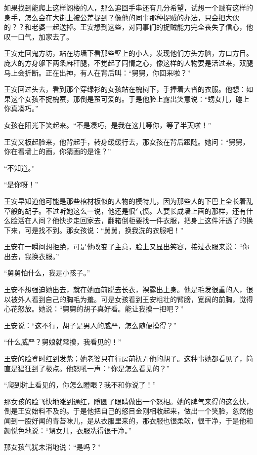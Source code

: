 如果找到能爬上这样阁楼的人，那么追回手串还有几分希望，试想一个贼有这样的身手，怎么会在大街上被公差捉到？像他的同事那种捉贼的办法，只会把大伙的？？和老婆一起送掉。王安想到这些，对同事们的捉贼能力完全丧失了信心，他叹一口气，加家去了。 

王安走回鬼方坊，站在坊墙下看那些壁上的小人，发现他们方头方脑，方口方目。庞大的方身躯下两条麻秆腿，不觉起了同情之心，像这样的人物要是活过来，双腿马上会折断。正在出神，有人在背后叫：“舅舅，你回来啦？” 

王安回过头去，看到那个穿绿衫的女孩站在槐树下，手捧着大沓的衣服。他想：如果这个女孩不捉槐蚕，那倒是蛮可爱的。于是他脸上露出笑意说：“甥女儿，碰上你真凑巧。” 

女孩在阳光下笑起来。“不是凑巧，是我在这儿等你，等了半天啦！” 

王安又板起脸来，他背起手，转身缓缓行去，那女孩在背后跟随。她问：“舅舅，你在看墙上的画，你猜画的是谁？” 

“不知道。” 

“是你呀！” 

王安早知道他可能是那些棺材板似的人物的模特儿，因为那些人的下巴上全长着乱草般的胡子。不过听她这么一说，他还是很气愤。人要长成墙上画的那样，还有什么脸活在人间？他快步走回家去，翻箱倒柜要找一件衣服，把身上这件汗透了的换下来，可是找不到。那女孩说：“舅舅，换我洗的衣服吧！” 

王安在一瞬间想拒绝，可是他改变了主意，脸上又显出笑容，接过衣服来说：“你出去，我换衣服。” 

“舅舅怕什么，我是小孩子。” 

王安不想强迫她出去，就在她面前脱去长衣，裸露出上身。他是毛发很重的人，很以被外人看到自己的胸毛为羞。可是女孩看到王安粗壮的臂膀，宽阔的前胸，觉得心花怒放。她说：“舅舅的胡子真好看。能让我摸一把吧？” 

王安说：“这不行，胡子是男人的威严，怎么随便摸得？” 

“什么威严？舅娘就常摸，我看见的！” 

王安的脸登时红到发紫；她老婆只在行房前抚弄他的胡子。这种事她都看见了，简直是猖狂到了极点。他怒吼一声：“你是怎么看见的？” 

“爬到树上看见的，你怎么瞪眼？我不和你说了！” 

那女孩的脸飞快地涨到通红，瞪圆了眼睛做出一个怒相。她的脾气来得的这么快，倒是王安始料不及的。于是他把自己的怒目金刚相收起来，做出一个笑脸，忽然他闻到一股好闻的青苔味儿，是从衣服里来的，那衣服也很柔软，很干净，于是他和颜悦色地说：“甥女儿，衣服冼得很干净。” 

那女孩气犹未消地说：“是吗？” 

